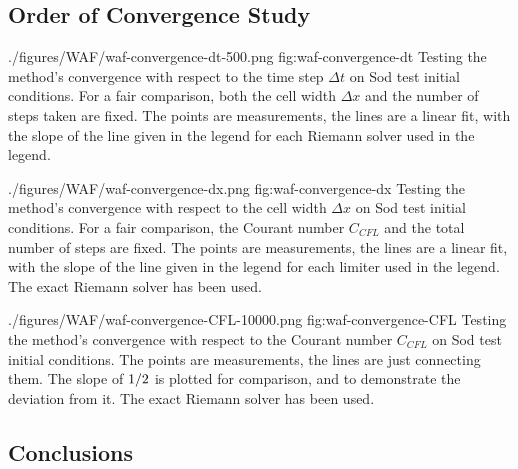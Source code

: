 \subsection{Order of Convergence Study}



\quickfigcap
	{./figures/WAF/waf-convergence-dt-500.png}
	{fig:waf-convergence-dt}
	{
		Testing the method's convergence with respect to the time step $\Delta t$ on Sod test initial conditions.
		For a fair comparison, both the cell width $\Delta x$ and the number of steps taken are fixed.
		The points are measurements, the lines are a linear fit, with the slope of the line given in the legend for each Riemann solver used in the legend.
	}


\quickfigcap
	{./figures/WAF/waf-convergence-dx.png}
	{fig:waf-convergence-dx}
	{
		Testing the method's convergence with respect to the cell width $\Delta x$ on Sod test initial conditions.
		For a fair comparison, the Courant number $C_{CFL}$ and the total number of steps are fixed.
		The points are measurements, the lines are a linear fit, with the slope of the line given in the legend for each limiter used in the legend.
		The exact Riemann solver has been used.
	}
	
\quickfigcap
	{./figures/WAF/waf-convergence-CFL-10000.png}
	{fig:waf-convergence-CFL}
	{
		Testing the method's convergence with respect to the Courant number $C_{CFL}$ on Sod test initial conditions.
		The points are measurements, the lines are just connecting them.
		The slope of $1/2$ is plotted for comparison, and to demonstrate the deviation from it.
		The exact Riemann solver has been used.
	}























\subsection{Conclusions}


